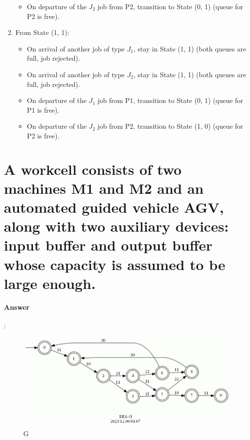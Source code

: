 \documentclass{article}
\begin{document}
\begin{enumerate}
\begin{itemize}
    \item On departure of the $J_2$ job from P2, transition to State (0, 1) (queue for P2 is free).
  \end{itemize}
  \item From State (1, 1):
  \begin{itemize}
    \item On arrival of another job of type $J_1$, stay in State (1, 1) (both queues are full, job rejected).
    \item On arrival of another job of type $J_2$, stay in State (1, 1) (both queues are full, job rejected).
    \item On departure of the $J_1$ job from P1, transition to State (0, 1) (queue for P1 is free).
    \item On departure of the $J_2$ job from P2, transition to State (1, 0) (queue for P2 is free).
  \end{itemize}
  
\end{enumerate}


\section{A workcell consists of two machines M1 and M2 and an automated guided vehicle AGV, along with two auxiliary devices: input buffer and output buffer whose capacity is assumed to be large enough.}

\paragraph{Answer}:

\begin{figure}[h]
  \centering
  \includegraphics[width=\linewidth]{findg.jpg}
  \caption{G}
  \label{fig:findg}
\end{figure}
\end{document}
